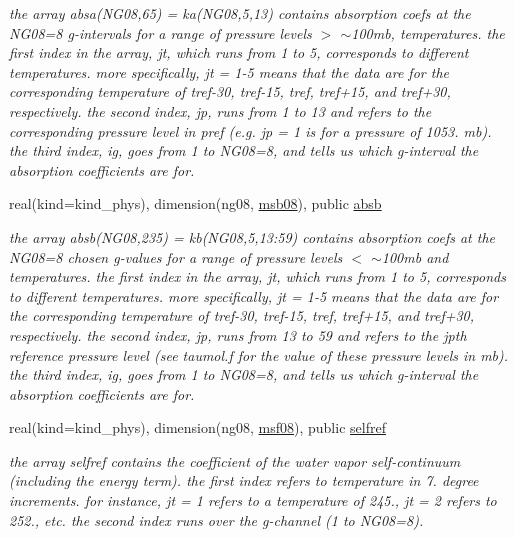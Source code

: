 \begin{Indent}
\begin{DoxyCompactItemize}
\begin{DoxyCompactList}\small\item\em the array absa(\+N\+G08,65) = ka(\+N\+G08,5,13) contains absorption coefs at the N\+G08=8 g-\/intervals for a range of pressure levels $>$ $\sim$100mb, temperatures. the first index in the array, jt, which runs from 1 to 5, corresponds to different temperatures. more specifically, jt = 1-\/5 means that the data are for the corresponding temperature of tref-\/30, tref-\/15, tref, tref+15, and tref+30, respectively. the second index, jp, runs from 1 to 13 and refers to the corresponding pressure level in pref (e.\+g. jp = 1 is for a pressure of 1053. mb). the third index, ig, goes from 1 to N\+G08=8, and tells us which g-\/interval the absorption coefficients are for. \end{DoxyCompactList}\item 
real(kind=kind\+\_\+phys), dimension(ng08, \hyperlink{group__module__radlw__kgbnn_ga3dd391fcce47d3aca3512bbfd946807b}{msb08}), public \hyperlink{group__module__radlw__kgbnn_ga23d4352fcafb0394d723e2f080a84ece}{absb}
\begin{DoxyCompactList}\small\item\em the array absb(\+N\+G08,235) = kb(\+N\+G08,5,13\+:59) contains absorption coefs at the N\+G08=8 chosen g-\/values for a range of pressure levels $<$ $\sim$100mb and temperatures. the first index in the array, jt, which runs from 1 to 5, corresponds to different temperatures. more specifically, jt = 1-\/5 means that the data are for the corresponding temperature of tref-\/30, tref-\/15, tref, tref+15, and tref+30, respectively. the second index, jp, runs from 13 to 59 and refers to the jpth reference pressure level (see taumol.\+f for the value of these pressure levels in mb). the third index, ig, goes from 1 to N\+G08=8, and tells us which g-\/interval the absorption coefficients are for. \end{DoxyCompactList}\item 
real(kind=kind\+\_\+phys), dimension(ng08, \hyperlink{group__module__radlw__kgbnn_ga7db22d5a0ece1b1f10cbf64ae1181a09}{msf08}), public \hyperlink{group__module__radlw__kgbnn_ga2c38561d26f86f7ae515b433843c4e5d}{selfref}
\begin{DoxyCompactList}\small\item\em the array selfref contains the coefficient of the water vapor self-\/continuum (including the energy term). the first index refers to temperature in 7. degree increments. for instance, jt = 1 refers to a temperature of 245., jt = 2 refers to 252., etc. the second index runs over the g-\/channel (1 to N\+G08=8). \end{DoxyCompactList}\item 

\end{DoxyCompactItemize}
\end{Indent}

